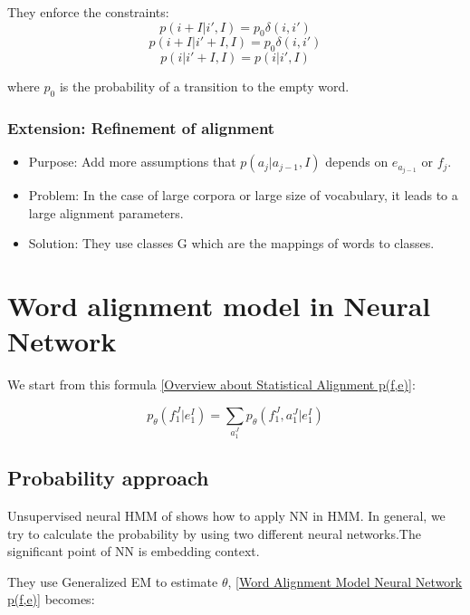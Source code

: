 \documentclass{article}
\begin{document}
They enforce the constraints:
\begin{equation}
p(i + I | i', I) = p_{0} \delta(i, i')
\end{equation}
\begin{equation}
p(i + I | i' + I, I) = p_{0} \delta(i, i')
\end{equation}
\begin{equation}
p(i | i' + I, I) = p(i | i', I )
\end{equation}

where $p_{0}$ is the probability of a transition to the empty word.

\subsubsection{Extension: Refinement of alignment}

\begin{itemize}
\item Purpose: Add more assumptions that $p(a_j | a_{j-1}, I)$ depends on $e_{a_{j -1}}$ or $f_j$.
\item Problem: In the case of large corpora or large size of vocabulary, it leads to a large alignment parameters.
\item Solution: They use classes G which are the mappings of words to classes.
\end{itemize}

\section{Word alignment model in Neural Network}
We start from this formula \eqref{Overview about Statistical Alignment p(f,e)}:

\begin{equation}
p_{\theta}(f_1^J|e_1^I) = \sum_{a_1^J} p_{\theta}(f_1^J, a_1^J|e_1^I)
\label{Word Alignment Model Neural Network p(f,e)}
\end{equation}

\subsection{Probability approach}
Unsupervised neural HMM of \cite{Tran16unsupervised} shows how to apply NN in HMM. In general, we try to calculate the probability by using two different neural networks.The significant point of NN is embedding context.

They use Generalized EM to estimate $\theta$, \eqref{Word Alignment Model Neural Network p(f,e)} becomes:
\end{document}
